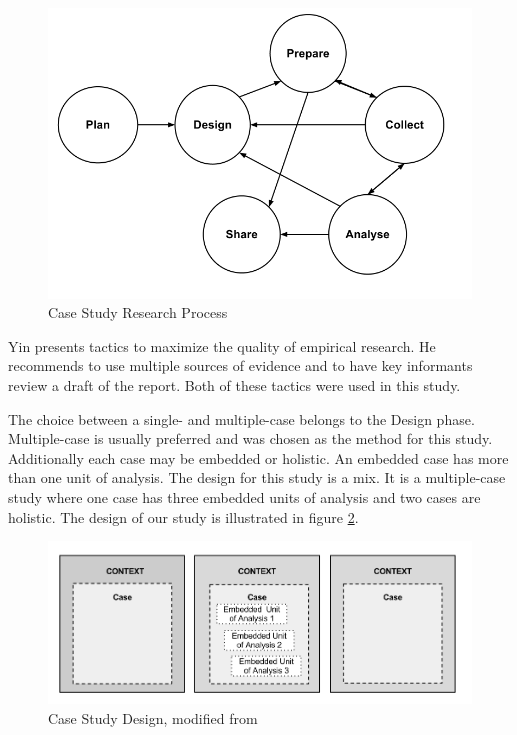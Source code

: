 \begin{figure}[h]
\begin{center}
\includegraphics[scale=0.38]{caseProcess.png}
\caption[Case Study Research Process]{Case Study Research Process \cite{CaseStudyResearch}}
\label{fig:caseProcess}
\end{center}
\end{figure}

Yin presents tactics to maximize the quality of empirical research. He recommends to use multiple sources of evidence and to have key informants review a draft of the report. Both of these tactics were used in this study. 

The choice between a single- and multiple-case belongs to the Design phase. Multiple-case is usually preferred and was chosen as the method for this study. Additionally each case may be embedded or holistic. An embedded case has more than one unit of analysis. The design for this study is a mix. It is a multiple-case study where one case has three embedded units of analysis and two cases are holistic. The design of our study is illustrated in figure \ref{fig:caseDesign}.

\begin{figure}[ht]
\hspace{-0.28cm}\includegraphics[scale=0.375]{caseStructure.png}
\caption[Case Design for This Study]{Case Study Design, modified from \cite{CaseStudyResearch}}
\label{fig:caseDesign}
\end{figure}


